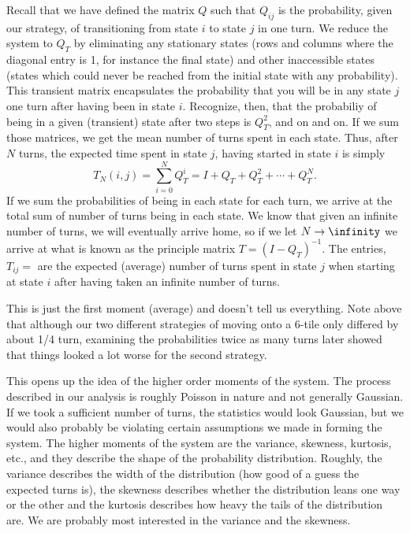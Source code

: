 \documentclass[letterpaper,11pt]{article}
\begin{document}
Recall that we have defined the matrix $Q$ such that $Q_{ij}$ is the
probability, given our strategy, of transitioning from state $i$ to state $j$ in
one turn.  We reduce the system to $Q_T$ by eliminating any stationary states
(rows and columns where the diagonal entry is 1, for instance the final state)
and other inaccessible states (states which could never be reached from the
initial state with any probability).  This transient matrix encapsulates the 
probability that you will be in any state $j$ one turn after having been in 
state $i$.  Recognize, then, that the probabiliy of being in a given (transient)
state after two steps is $Q_T^2$, and on and on.  If we sum those matrices, we
get the mean number of turns spent in each state.  Thus, after $N$ turns, the
expected time spent in state $j$, having started in state $i$ is simply
\[
	T_N(i,j)=\sum_{i=0}^{N} Q_T^i=I+Q_T+Q_T^2+\cdots+Q_T^N.
\]
If we sum the probabilities of being  in each state for each turn, we arrive
at the total sum of number of turns being in each state.  We know that given an
infinite number of turns, we will eventually arrive home, so if we let $N
\rightarrow \infinity$ we arrive at what is known as the principle matrix
$T=(I-Q_T)^{-1}$.  The entries, $T_{ij}=$ are the expected (average) number
of turns spent in state $j$ when starting at state $i$ after having taken an
infinite number of turns.

This is just the first moment (average) and doesn't tell us everything.  Note
above that although our two different strategies of moving onto a 6-tile only
differed by about 1/4 turn, examining the probabilities twice as many turns 
later showed that things looked a lot worse for the second strategy.

This opens up the idea of the higher order moments of the system.  The process
described in our analysis is roughly Poisson in nature and not generally
Gaussian.  If we took a sufficient number of turns, the statistics would look
Gaussian, but we would also probably be violating certain assumptions we made in
forming the system.  The higher moments of the
system are the variance, skewness, kurtosis, etc., and they describe the shape
of the probability distribution.  Roughly, the variance describes the width
of the distribution (how good of a guess the expected turns is), the skewness
describes whether the distribution leans one way or the other and the kurtosis
describes how heavy the tails of the distribution are.  We are probably most
interested in the variance and the skewness.
\end{document}
